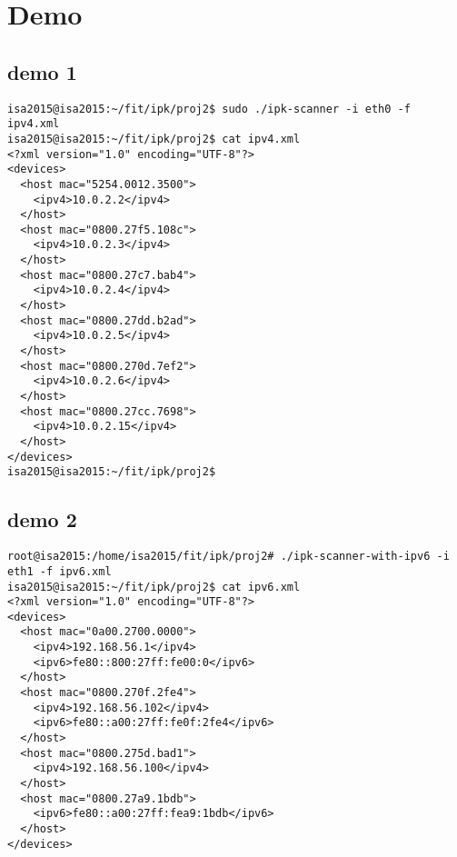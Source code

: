 \documentclass[a4paper, 11pt]{article}
\begin{document}
\section{Demo}

\subsection{demo 1}
\begin{lstlisting}
isa2015@isa2015:~/fit/ipk/proj2$ sudo ./ipk-scanner -i eth0 -f ipv4.xml
isa2015@isa2015:~/fit/ipk/proj2$ cat ipv4.xml
<?xml version="1.0" encoding="UTF-8"?>
<devices>
  <host mac="5254.0012.3500">
    <ipv4>10.0.2.2</ipv4>
  </host>
  <host mac="0800.27f5.108c">
    <ipv4>10.0.2.3</ipv4>
  </host>
  <host mac="0800.27c7.bab4">
    <ipv4>10.0.2.4</ipv4>
  </host>
  <host mac="0800.27dd.b2ad">
    <ipv4>10.0.2.5</ipv4>
  </host>
  <host mac="0800.270d.7ef2">
    <ipv4>10.0.2.6</ipv4>
  </host>
  <host mac="0800.27cc.7698">
    <ipv4>10.0.2.15</ipv4>
  </host>
</devices>
isa2015@isa2015:~/fit/ipk/proj2$ 

\end{lstlisting}

\subsection{demo 2}
\begin{lstlisting}
root@isa2015:/home/isa2015/fit/ipk/proj2# ./ipk-scanner-with-ipv6 -i eth1 -f ipv6.xml
isa2015@isa2015:~/fit/ipk/proj2$ cat ipv6.xml
<?xml version="1.0" encoding="UTF-8"?>
<devices>
  <host mac="0a00.2700.0000">
    <ipv4>192.168.56.1</ipv4>
    <ipv6>fe80::800:27ff:fe00:0</ipv6>
  </host>
  <host mac="0800.270f.2fe4">
    <ipv4>192.168.56.102</ipv4>
    <ipv6>fe80::a00:27ff:fe0f:2fe4</ipv6>
  </host>
  <host mac="0800.275d.bad1">
    <ipv4>192.168.56.100</ipv4>
  </host>
  <host mac="0800.27a9.1bdb">
    <ipv6>fe80::a00:27ff:fea9:1bdb</ipv6>
  </host>
</devices>

\end{lstlisting}

\pagebreak


\end{document}
